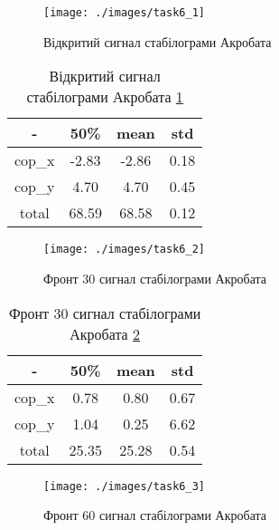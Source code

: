 \begin{figure}[!ht]
    \centering
    \texttt{[image: ./images/task6\_1]}
    \caption{Відкритий сигнал стабілограми Акробата}
    \label{fig:acrobats_base_open}
\end{figure}

\begin{table}[!ht]
    \centering
    \caption{Відкритий сигнал стабілограми Акробата \ref{fig:acrobats_base_open}}
    \label{tab:acrobats_base_open}

    \begin{tabular}{|c|c|c|c|}
        \toprule
        -      & 50\%  & mean  & std  \\

        \midrule
        cop\_x & -2.83 & -2.86 & 0.18 \\
        \hline
        cop\_y & 4.70  & 4.70  & 0.45 \\

        \bottomrule
        total  & 68.59 & 68.58 & 0.12 \\
        \hline
    \end{tabular}
\end{table}

\begin{figure}[!ht]
    \centering
    \texttt{[image: ./images/task6\_2]}
    \caption{Фронт 30 сигнал стабілограми Акробата}
    \label{fig:acrobats_sway_front30}
\end{figure}

\begin{table}[!ht]
    \centering
    \caption{Фронт 30 сигнал стабілограми Акробата \ref{fig:acrobats_sway_front30}}
    \label{tab:acrobats_sway_front30}

    \begin{tabular}{|c|c|c|c|}
        \toprule
        -      & 50\%  & mean  & std  \\

        \midrule
        cop\_x & 0.78  & 0.80  & 0.67 \\
        \hline
        cop\_y & 1.04  & 0.25  & 6.62 \\

        \bottomrule
        total  & 25.35 & 25.28 & 0.54 \\
        \hline
    \end{tabular}
\end{table}

\begin{figure}[!ht]
    \centering
    \texttt{[image: ./images/task6\_3]}
    \caption{Фронт 60 сигнал стабілограми Акробата}
    \label{fig:acrobats_sway_front60}
\end{figure}

